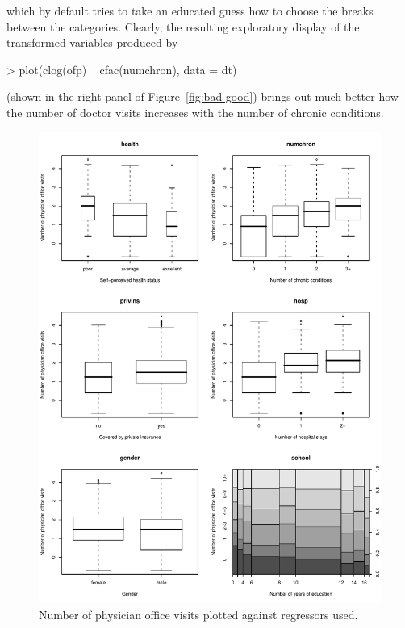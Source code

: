 \documentclass{Z}
\begin{document}
which by default tries to take an educated guess how to choose the breaks between the categories.
Clearly, the resulting exploratory display of the transformed variables produced by

\begin{Schunk}
\begin{Sinput}
> plot(clog(ofp) ~ cfac(numchron), data = dt)
\end{Sinput}
\end{Schunk}

(shown in the right panel of Figure~\ref{fig:bad-good}) brings out much better
how the number of doctor visits increases with the number of chronic conditions.

\begin{figure}[p]
\begin{center}
\includegraphics{countreg-ofp2-plot1}
\caption{\label{fig:ofp2} Number of physician office visits plotted against regressors used.}
\end{center}
\end{figure}
\end{document}
